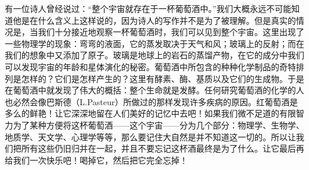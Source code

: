 有一位诗人曾经说过：“整个宇宙就存在于一杯葡萄酒中。”我们大概永远不可能知道他是在什么含义上这样说的，因为诗人的写作并不是为了被理解。但是真实的情况是，当我们十分接近地观察一杯葡萄酒时，我们可以见到整个宇宙。这里出现了一些物理学的现象：弯弯的液面，它的蒸发取决于天气和风；玻璃上的反射；而在我们的想象中又添加了原子。玻璃是地球上的岩石的蒸馏产物，在它的成分中我们可以发现宇宙的年龄和星体演化的秘密。葡萄酒中所包含的种种化学制品的奇特排列是怎样的？它们是怎样产生的？这里有酵素、酶、基质以及它们的生成物。于是在葡萄酒中就发现了伟大的概括：整个生命就是发酵。任何研究葡萄酒的化学的人也必然会像巴斯德（L.Pasteur）所做过的那样发现许多疾病的原因。红葡萄酒是多么的鲜艳！让它深深地留在人们美好的记忆中去吧！如果我们微不足道的有限智力为了某种方便将这杯葡萄酒——这个宇宙——分为几个部分：物理学、生物学、地质学、天文学、心理学等等，那么要记住大自然是并不知道这一切的。所以让我们把所有这些仍旧归并在一起，并且不要忘记这杯酒最终是为了什么。让它最后再给我们一次快乐吧！喝掉它，然后把它完全忘掉！
